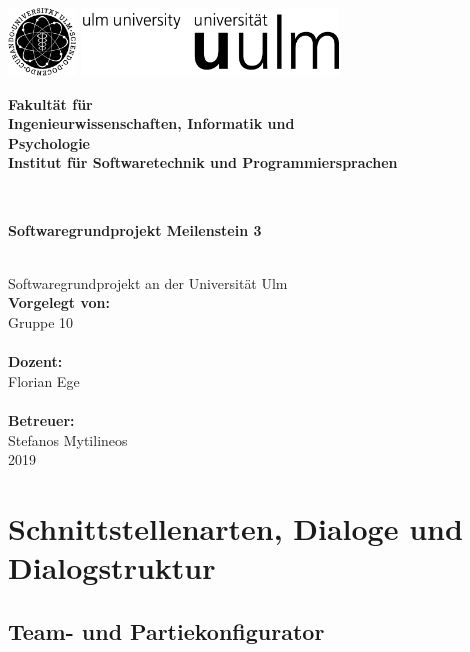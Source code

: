 \documentclass[a4paper,12pt,
headsepline,           %
oneside,               %
pointlessnumbers,      %
bibtotoc,              %
]{scrartcl}
\newcommand{\fullname}{Gruppe 10}
\newcommand{\titel}{Softwaregrundprojekt Meilenstein 3}
\newcommand{\jahr}{2019}
\newcommand{\dozent}{Florian Ege}
\newcommand{\betreuer}{Stefanos Mytilineos}
\newcommand{\fakultaet}{Ingenieurwissenschaften, Informatik und\\Psychologie}
\newcommand{\institut}{Institut für Softwaretechnik und Programmiersprachen}
\begin{document}
    \thispagestyle{empty}
    \begin{addmargin*}[4mm]{-10mm}

        \includegraphics[height=1.8cm]{images/unilogo_bild}
        \hfill
        \includegraphics[height=1.8cm]{images/unilogo_wort}\\[1em]

        {\footnotesize
        \hspace*{115mm}\parbox[t]{35mm}{\bfseries Fakultät für\\
        \fakultaet\\
        \mdseries \institut}\\[2cm]

        \parbox{140mm}{\bfseries \LARGE \titel}\\[2.5em]
        {\footnotesize Softwaregrundprojekt an der Universität Ulm}\\[3em]

        {\footnotesize \bfseries Vorgelegt von:}\\
        {\footnotesize \fullname\\}\\ [1em]
        {\footnotesize \bfseries Dozent:}\\
        {\footnotesize \dozent\\}\\[1em]
        {\footnotesize \bfseries Betreuer:}\\
        {\footnotesize \betreuer}\\ [1em]
        {\footnotesize \jahr}
        }
    \end{addmargin*}
    \pagebreak
    \tableofcontents
    \pagebreak
    
    \section{Schnittstellenarten, Dialoge und Dialogstruktur}
    
    \subsection{Team- und Partiekonfigurator}
    
\end{document}
